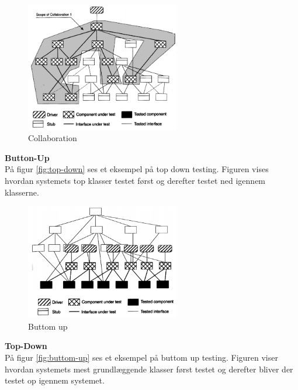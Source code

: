 \vspace{-5pt}
\begin{figure}[H]
	\centering
	\includegraphics[width=0.6\textwidth]{Billeder/Test/collaboration.png}
	\vspace{-5pt}
	\caption{Collaboration}
	\label{fig:Collaboration}
\end{figure}


\textbf{Button-Up}\\
På figur \ref{fig:top-down} ses et eksempel på top down testing. Figuren vises hvordan systemets top klasser testet først og derefter testet ned igennem klasserne.

\begin{figure}[H]
	\centering
	\includegraphics[width=0.6\textwidth]{Billeder/Test/buttom-up.png}
	\vspace{-5pt}
	\caption{Buttom up}
	\label{fig:Buttom_up}
\end{figure}

\newpage

\textbf{Top-Down}\\
På figur \ref{fig:buttom-up} ses et eksempel på buttom up testing. Figuren viser hvordan systemets mest grundlæggende klasser først testet og derefter bliver der testet op igennem systemet. 

